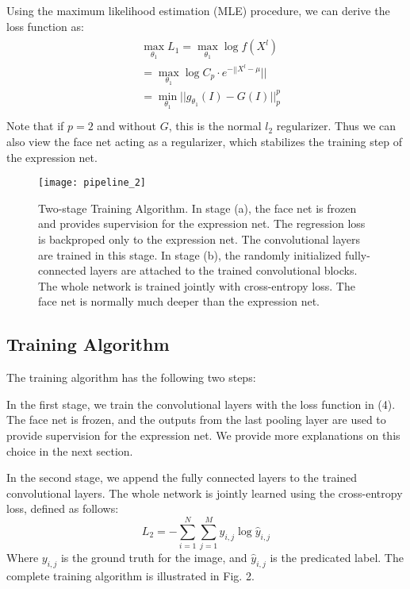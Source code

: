 \documentclass[a4paper, 10pt, conference]{ieeeconf}      %
\begin{document}
Using the maximum likelihood estimation (MLE) procedure, we can derive the loss function as:
\begin{align}
\begin{split}
&\max_{\theta_{1}} L_1 = \max_{\theta_{1}} \log f(X^l) \\
&=\max_{\theta_{1}} \log C_p \cdot e^{-||X^l - \mu}||\\
&=\min_{\theta_{1}} ||g_{\theta_1}(I) - G(I)||_p^p\\
\end{split}
\end{align}
Note that if $p=2$ and without $G$, this is the normal $l_2$ regularizer. Thus we can also view the face net acting as a regularizer, which stabilizes the training step of the expression net.


\begin{figure}[!ht]
  \centering
  \texttt{[image: pipeline\_2]}
  \caption{Two-stage Training Algorithm. In stage (a), the face net is frozen and provides supervision for the expression net. The regression loss is backproped only to the expression net. The convolutional layers are trained in this stage. In stage (b), the randomly initialized fully-connected layers are attached to the trained convolutional blocks. The whole network is trained jointly with cross-entropy loss. The face net is normally much deeper than the expression net.}
  \label{figurelabel}
\end{figure}


\subsection{Training Algorithm}
The training algorithm has the following two steps:

In the first stage, we train the convolutional layers with the loss function in (4). The face net is frozen, and the outputs from the last pooling layer are used to provide supervision for the expression net. We provide more explanations on this choice in the next section.


In the second stage, we append the fully connected layers to the trained convolutional layers. The whole network is jointly learned using the cross-entropy loss, defined as follows:
\begin{equation}
L_2 = - \sum_{i=1}^N \sum_{j=1}^M y_{i,j} \log \hat{y}_{i,j}
\end{equation}
Where $y_{i,j}$ is the ground truth for the image, and $\hat{y}_{i,j}$ is the predicated label.
 The complete training algorithm is illustrated in Fig. 2.
\end{document}
